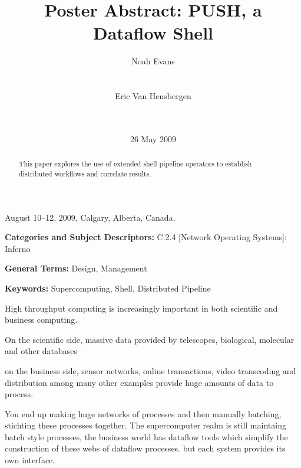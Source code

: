 \documentclass{sig-alt-release2}
\begin{document}
 {August 10--12, 2009, Calgary, Alberta, Canada.} 
\title{Poster Abstract: PUSH, a Dataflow Shell}

\author{
\alignauthor Noah Evans \\
\\
\\
\alignauthor Eric Van Hensbergen \\
\\
\\
}
\date{26 May 2009}

\maketitle

\begin{abstract}
This paper explores the use of extended shell pipeline operators to
establish distributed workflows and correlate results.
\end{abstract}

\vspace{1mm}
\noindent
{\bf Categories and Subject Descriptors:} C.2.4 {[Network Operating Systems]}: {Inferno}

\vspace{1mm}
\noindent
{\bf General Terms:} Design, Management 

\vspace{1mm}
\noindent
{\bf Keywords:} Supercomputing, Shell, Distributed Pipeline

High throughput computing is increasingly important in both scientific and business computing.

On the scientific side, massive data provided by telescopes, biological, molecular and other databases 

on the business side,  sensor networks, 
online transactions, video transcoding and distribution among many other examples provide huge amounts of data to process. 

You end up making huge networks of processes and then manually batching, stichting these processes together. The supercomputer realm is still maintaing batch style processes, the business world has dataflow tools which simplify the construction of these webs of dataflow processes. but each system provides its own interface. 
\end{document}
